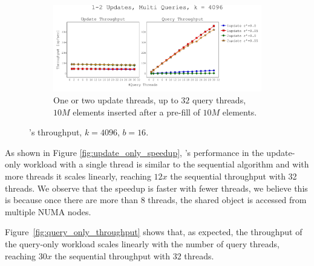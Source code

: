 \begin{figure}[h]
    \begin{subfigure}[]{\textwidth}
        \centering
        \includegraphics[width=\textwidth,trim={0cm 0cm 0cm 1cm},clip]
        {graphics/graphs/throughput/oracle_Quancurrent_blocking_numa_update_query_k_4096_b16_keys10M_pre10M_preT1_runs15_Tu1-2_Tq2-30_snapshot1_rho_1_0-05_united_16-08-2022_07-09-08.pdf}
        \caption{One or two update threads, up to $32$ query threads, $10M$ elements inserted after a pre-fill of $10M$ elements.}
        \label{fig:mixed_throughput}
    \end{subfigure}
    \caption{\mysketch's throughput, $k=4096$, $b=16$.}
    \label{fig:throughput}
\end{figure}


As shown in Figure \ref{fig:update_only_speedup}, \mysketch's performance in the update-only workload with a single thread is similar to the sequential algorithm and with more threads it scales linearly, reaching $12x$ the sequential throughput with 32 threads. 
We observe that the speedup is faster with fewer threads, we believe this is because once there are more than $8$ threads, the shared object is accessed from multiple NUMA nodes.


Figure~\ref{fig:query_only_throughput} shows that, as expected, the throughput of the query-only workload scales linearly with the number of query threads, reaching $30x$ the sequential throughput with 32 threads.


